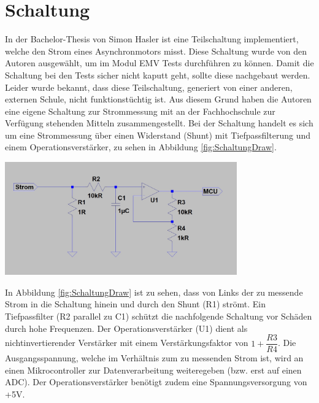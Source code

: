 \section{Schaltung}
\label{sec:Schaltung}


In der Bachelor-Thesis von Simon Hasler ist eine Teilschaltung implementiert, welche den Strom eines Asynchronmotors misst. Diese Schaltung wurde von den Autoren ausgewählt, um im Modul EMV Tests durchführen zu können. Damit die Schaltung bei den Tests sicher nicht kaputt geht, sollte diese nachgebaut werden. Leider wurde bekannt, dass diese Teilschaltung, generiert von einer anderen, externen Schule, nicht funktionstüchtig ist. Aus diesem Grund haben die Autoren eine eigene Schaltung zur Strommessung mit an der Fachhochschule zur Verfügung stehenden Mitteln zusammengestellt. Bei der Schaltung handelt es sich um eine Strommessung über einen Widerstand (Shunt) mit Tiefpassfilterung und einem Operationsverstärker, zu sehen in Abbildung \ref{fig:SchaltungDraw}.\\

\begin{minipage}[b][6cm][t]{1\textwidth}
\centering
\includegraphics[angle=0,width=0.75\textwidth]{graphics/SchaltungDraw.jpg}
\label{fig:SchaltungDraw}
\end{minipage}
\vspace*{0.25cm}

In Abbildung \ref{fig:SchaltungDraw} ist zu sehen, dass von Links der zu messende Strom in die Schaltung hinein und durch den Shunt (R1) strömt. Ein Tiefpassfilter (R2 parallel zu C1) schützt die nachfolgende Schaltung vor Schäden durch hohe Frequenzen. Der Operationsverstärker (U1) dient als nichtinvertierender Verstärker mit einem Verstärkungsfaktor von $1+\dfrac{R3}{R4}$. Die Ausgangsspannung, welche im Verhältnis zum zu messenden Strom ist, wird an einen Mikrocontroller zur Datenverarbeitung weiteregeben (bzw. erst auf einen ADC). Der Operationsverstärker benötigt zudem eine Spannungsversorgung von +5V.\\

